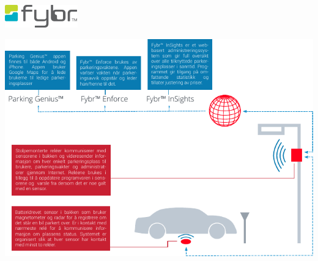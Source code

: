 \documentclass[xetex]{beamer}
\begin{document}
\begin{frame}
	\bigskip
	\hfill\includegraphics[scale=0.3]{grafikk/logoer/fybr.png} \\ [-1em]
	\bigskip
	\centerline{\includegraphics{grafikk/eksisterende_systemer/fybr_smaller.pdf}}
\end{frame}
\end{document}
